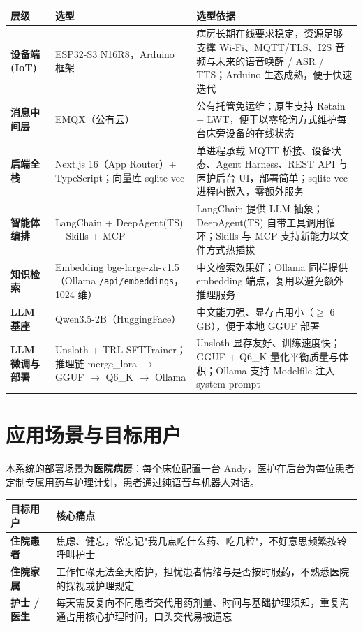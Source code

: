 \documentclass[10pt,a4paper]{article}
\begin{document}
\begin{center}
\footnotesize
\begin{tabularx}{\textwidth}{|>{\bfseries}p{2.4cm}|p{4.6cm}|p{6.8cm}|}
\hline
\rowcolor{midgray}
\textbf{层级} & \textbf{选型} & \textbf{选型依据} \\
\hline
设备端 (IoT) & ESP32-S3 N16R8，Arduino 框架 & 病房长期在线要求稳定，资源足够支撑 Wi-Fi、MQTT/TLS、I2S 音频与未来的语音唤醒 / ASR / TTS；Arduino 生态成熟，便于快速迭代 \\
\hline
消息中间层 & EMQX（公有云） & 公有托管免运维；原生支持 Retain + LWT，便于以零轮询方式维护每台床旁设备的在线状态 \\
\hline
后端全栈 & Next.js 16（App Router）+ TypeScript；向量库 sqlite-vec & 单进程承载 MQTT 桥接、设备状态、Agent Harness、REST API 与医护后台 UI，部署简单；sqlite-vec 进程内嵌入，零额外服务 \\
\hline
智能体编排 & LangChain + DeepAgent(TS) + Skills + MCP & LangChain 提供 LLM 抽象；DeepAgent(TS) 自带工具调用循环；Skills 与 MCP 支持新能力以文件方式热插拔 \\
\hline
知识检索 & Embedding bge-large-zh-v1.5（Ollama \texttt{/api/embeddings}，1024 维） & 中文检索效果好；Ollama 同样提供 embedding 端点，复用以避免额外推理服务 \\
\hline
LLM 基座 & Qwen3.5-2B（HuggingFace） & 中文能力强、显存占用小（$\geq$ 6 GB），便于本地 GGUF 部署 \\
\hline
LLM 微调与部署 & Unsloth + TRL SFTTrainer；推理链 merge\_lora $\rightarrow$ GGUF $\rightarrow$ Q6\_K $\rightarrow$ Ollama & Unsloth 显存友好、训练速度快；GGUF + Q6\_K 量化平衡质量与体积；Ollama 支持 Modelfile 注入 system prompt \\
\hline
\end{tabularx}
\end{center}

\section{应用场景与目标用户}

本系统的部署场景为\textbf{医院病房}：每个床位配置一台 Andy，医护在后台为每位患者定制专属用药与护理计划，患者通过纯语音与机器人对话。

\begin{center}
\footnotesize
\begin{tabularx}{\textwidth}{|>{\bfseries}p{2.2cm}|X|}
\hline
\rowcolor{midgray}
\textbf{目标用户} & \textbf{核心痛点} \\
\hline
住院患者 & 焦虑、健忘，常忘记"我几点吃什么药、吃几粒"，不好意思频繁按铃呼叫护士 \\
\hline
住院家属 & 工作忙碌无法全天陪护，担忧患者情绪与是否按时服药，不熟悉医院的探视或护理规定 \\
\hline
护士 / 医生 & 每天需反复向不同患者交代用药剂量、时间与基础护理须知，重复沟通占用核心护理时间，口头交代易被遗忘 \\
\hline
\end{tabularx}
\end{center}
\end{document}
